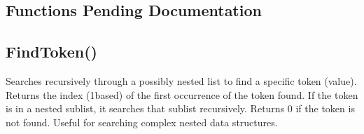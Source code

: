 \documentclass[letterpaper,10pt,english]{sphinxmanual}
\begin{document}
\subsection{Functions Pending Documentation}
\label{\detokenize{reference/design:functions-pending-documentation}}
\ignorespaces 

\subsection{FindToken()}
\label{\detokenize{reference/design:findtoken}}\label{\detokenize{reference/design:index-21}}
\sphinxAtStartPar
{}

\sphinxAtStartPar
{}

\sphinxAtStartPar
Searches recursively through a possibly nested list to find a specific token (value). Returns the index (1\sphinxhyphen{}based) of the first occurrence of the token found. If the token is in a nested sublist, it searches that sublist recursively. Returns 0 if the token is not found. Useful for searching complex nested data structures.

\sphinxAtStartPar
{}

\begin{sphinxVerbatim}[commandchars=\\\{\}]
\end{sphinxVerbatim}

\sphinxAtStartPar
{}
\end{document}
